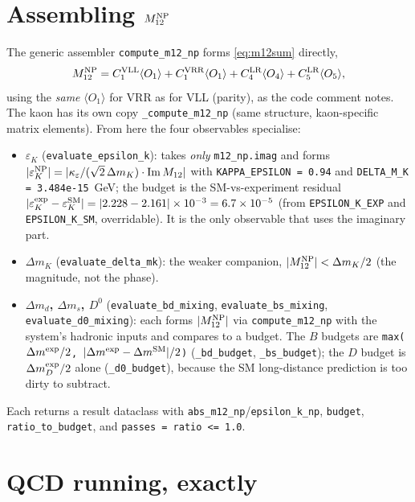 \documentclass[11pt]{article}
\newcommand{\eps}{\varepsilon}
\newcommand{\Mtwelve}{M_{12}}
\newcommand{\ImMtwelve}{\mathrm{Im}\,M_{12}}
\newcommand{\CVLL}{C_1^{\mathrm{VLL}}}
\newcommand{\CVRR}{C_1^{\mathrm{VRR}}}
\newcommand{\CLRfour}{C_4^{\mathrm{LR}}}
\newcommand{\CLRfive}{C_5^{\mathrm{LR}}}
\newcommand{\code}[1]{\texttt{#1}}
\theoremstyle{definition}
\begin{document}
\section{Assembling $M_{12}^{\rm NP}$}
\label{sec:codeM12}

The generic assembler \code{compute\_m12\_np} forms \eqref{eq:m12sum} directly,
\begin{equation}
\Mtwelve^{\rm NP} = \CVLL\langle O_1\rangle + \CVRR\langle O_1\rangle
+ \CLRfour\langle O_4\rangle + \CLRfive\langle O_5\rangle,
\label{eq:codeM12}
\end{equation}
using the \emph{same} $\langle O_1\rangle$ for VRR as for VLL (parity), as the
code comment notes. The kaon has its own copy \code{\_compute\_m12\_np} (same
structure, kaon-specific matrix elements). From here the four observables
specialise:
\begin{itemize}[leftmargin=1.4em]
\item \textbf{$\eps_K$} (\code{evaluate\_epsilon\_k}): takes \emph{only}
\code{m12\_np.imag} and forms
$|\eps_K^{\rm NP}| = |\kappa_\eps/(\sqrt2\,\Delta m_K)\cdot\ImMtwelve|$ with
\code{KAPPA\_EPSILON = 0.94} and \code{DELTA\_M\_K = 3.484e-15}~GeV; the budget is
the SM-vs-experiment residual
$|\eps_K^{\rm exp}-\eps_K^{\rm SM}| = |2.228-2.161|\times10^{-3}=6.7\times10^{-5}$
(from \code{EPSILON\_K\_EXP} and \code{EPSILON\_K\_SM}, overridable). It is the
only observable that uses the imaginary part.
\item \textbf{$\Delta m_K$} (\code{evaluate\_delta\_mk}): the weaker companion,
$|\Mtwelve^{\rm NP}|<\Delta m_K/2$ (the magnitude, not the phase).
\item \textbf{$\Delta m_d$, $\Delta m_s$, $D^0$}
(\code{evaluate\_bd\_mixing}, \code{evaluate\_bs\_mixing},
\code{evaluate\_d0\_mixing}): each forms $|\Mtwelve^{\rm NP}|$ via
\code{compute\_m12\_np} with the system's hadronic inputs and compares to a budget.
The $B$ budgets are
\code{max($\Delta m^{\rm exp}/2$, $|\Delta m^{\rm exp}-\Delta m^{\rm SM}|/2$)}
(\code{\_bd\_budget}, \code{\_bs\_budget}); the $D$ budget is
$\Delta m_D^{\rm exp}/2$ alone (\code{\_d0\_budget}), because the SM long-distance
prediction is too dirty to subtract.
\end{itemize}
Each returns a result dataclass with \code{abs\_m12\_np}/\code{epsilon\_k\_np},
\code{budget}, \code{ratio\_to\_budget}, and \code{passes = ratio <= 1.0}.

\section{QCD running, exactly}
\label{sec:codeRunning}
\end{document}
